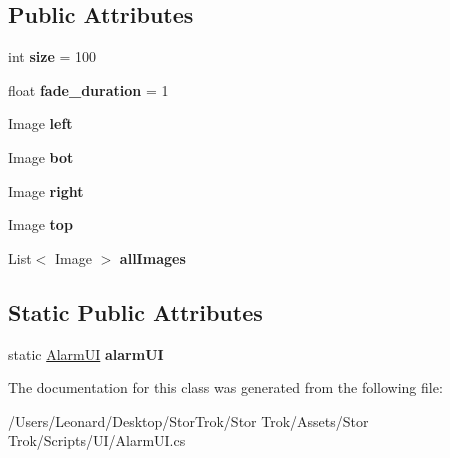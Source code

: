 \subsection*{Public Attributes}
\begin{DoxyCompactItemize}
\item 
\mbox{\label{class_alarm_u_i_ab0fdc728cde26889644a5d049572e9ed}} 
int {\bfseries size} = 100
\item 
\mbox{\label{class_alarm_u_i_af86bb24014cabdd299cb272ced8d7288}} 
float {\bfseries fade\+\_\+duration} = 1
\item 
\mbox{\label{class_alarm_u_i_a78bd9fd39824dec673655d5abde9ab23}} 
Image {\bfseries left}
\item 
\mbox{\label{class_alarm_u_i_a82a2c9cccd6006726f290c7170c34f86}} 
Image {\bfseries bot}
\item 
\mbox{\label{class_alarm_u_i_aaec62da22f7efc761dfb29ba20c61c32}} 
Image {\bfseries right}
\item 
\mbox{\label{class_alarm_u_i_a0b6deced69b4466f8fb03cf4d945b4b0}} 
Image {\bfseries top}
\item 
\mbox{\label{class_alarm_u_i_aafaba46ad3e7cc0bea53caf79039326b}} 
List$<$ Image $>$ {\bfseries all\+Images}
\end{DoxyCompactItemize}
\subsection*{Static Public Attributes}
\begin{DoxyCompactItemize}
\item 
\mbox{\label{class_alarm_u_i_a5887790cd7ad779fd85a748edd1a5750}} 
static \hyperlink{class_alarm_u_i}{Alarm\+UI} {\bfseries alarm\+UI}
\end{DoxyCompactItemize}


The documentation for this class was generated from the following file\+:\begin{DoxyCompactItemize}
\item 
/\+Users/\+Leonard/\+Desktop/\+Stor\+Trok/\+Stor Trok/\+Assets/\+Stor Trok/\+Scripts/\+U\+I/Alarm\+U\+I.\+cs\end{DoxyCompactItemize}
